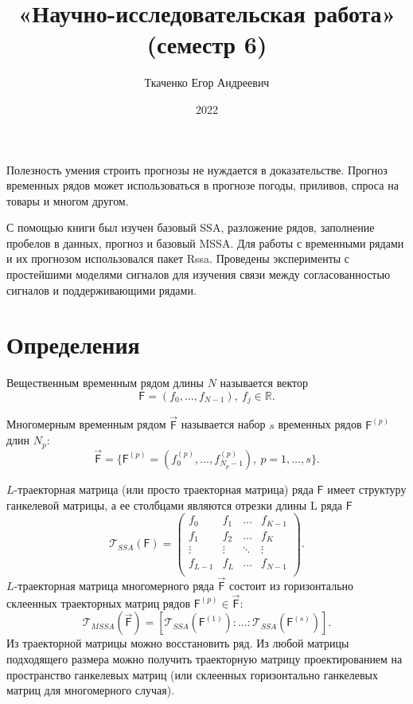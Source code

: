 \documentclass[specialist, substylefile = spbureport.rtx,
    subf,href,colorlinks=true, 12pt]{disser}
\title{«Научно-исследовательская работа» (семестр 6)}
\author{Ткаченко Егор Андреевич}
\date{2022}
\newcommand{\T}{\mathcal{T}}
\newcommand{\F}{\mathsf{F}}
\newcommand{\MF}{\vec{\F}}
\begin{document}
    \maketitle
    \pagebreak
    \tableofcontents
    \pagebreak

    \intro
        Полезность умения строить прогнозы не нуждается в доказательстве. Прогноз временных рядов может использоваться в прогнозе погоды, приливов, спроса на товары и многом другом.
         
        С помощью книги \cite{SSA_with_R} был изучен базовый SSA, разложение рядов, заполнение пробелов в данных, прогноз и базовый MSSA. Для работы с временными рядами и их прогнозом использовался пакет Rssa. Проведены эксперименты с простейшими моделями сигналов для изучения связи между согласованностью сигналов и поддерживающими рядами.



    \section{Определения}
        Вещественным временным рядом длины $N$ называется вектор
        $$\F = (f_0, \dots, f_{N - 1}),\ f_j \in \mathbb{R}.$$

        Многомерным временным рядом $\MF$ называется набор $s$ временных рядов $\F^{(p)}$ длин $N_p$:
        $$\MF = \{\F^{(p)} = (f^{(p)}_0, \dots, f^{(p)}_{N_p - 1}),\ p=1, \dots, s\}.$$

        $L$-траекторная матрица (или просто траекторная матрица) ряда $\F$ имеет структуру ганкелевой матрицы, а ее столбцами являются отрезки длины L ряда $\F$
        $$\T_{SSA}(\F) =
        \begin{pmatrix}
            f_0     & f_1    & \dots  & f_{K-1} \\
            f_1     & f_2    & \dots  & f_K     \\
            \vdots  & \vdots & \ddots & \vdots  \\
            f_{L-1} & f_L    & \dots  & f_{N-1} \\
        \end{pmatrix}.$$
        $L$-траекторная матрица многомерного ряда $\MF$ состоит из горизонтально склеенных траекторных матриц рядов $\F^{(p)} \in \MF$:
        $$\T_{MSSA}(\MF) = [\T_{SSA}(\F^{(1)}): \dotso :\T_{SSA}(\F^{(s)})].$$
        Из траекторной матрицы можно восстановить ряд. Из любой матрицы подходящего размера можно получить траекторную матрицу проектированием на пространство ганкелевых матриц (или склеенных горизонтально ганкелевых матриц для многомерного случая).
\end{document}
